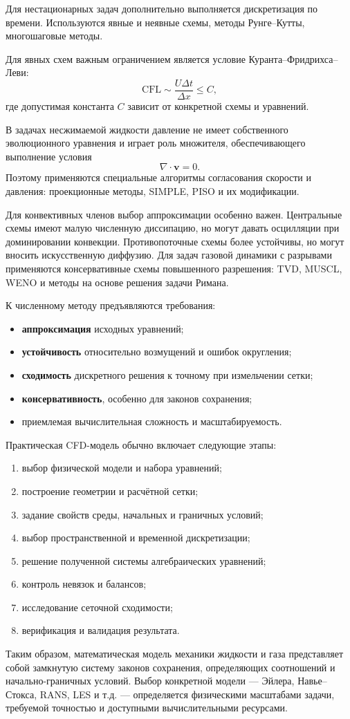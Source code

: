 Для нестационарных задач дополнительно выполняется дискретизация по времени. Используются явные и неявные схемы, методы Рунге--Кутты, многошаговые методы.

Для явных схем важным ограничением является условие Куранта--Фридрихса--Леви:
\[
\mathrm{CFL}
\sim
\frac{U\Delta t}{\Delta x}
\le C,
\]
где допустимая константа $C$ зависит от конкретной схемы и уравнений.

В задачах несжимаемой жидкости давление не имеет собственного эволюционного уравнения и играет роль множителя, обеспечивающего выполнение условия
\[
\nabla\cdot\mathbf{v}=0.
\]
Поэтому применяются специальные алгоритмы согласования скорости и давления: проекционные методы, SIMPLE, PISO и их модификации.

Для конвективных членов выбор аппроксимации особенно важен. Центральные схемы имеют малую численную диссипацию, но могут давать осцилляции при доминировании конвекции. Противопоточные схемы более устойчивы, но могут вносить искусственную диффузию. Для задач газовой динамики с разрывами применяются консервативные схемы повышенного разрешения: TVD, MUSCL, WENO и методы на основе решения задачи Римана.

К численному методу предъявляются требования:
\begin{itemize}
	\item \textbf{аппроксимация} исходных уравнений;
	\item \textbf{устойчивость} относительно возмущений и ошибок округления;
	\item \textbf{сходимость} дискретного решения к точному при измельчении сетки;
	\item \textbf{консервативность}, особенно для законов сохранения;
	\item приемлемая вычислительная сложность и масштабируемость.
\end{itemize}

Практическая CFD-модель обычно включает следующие этапы:
\begin{enumerate}
	\item выбор физической модели и набора уравнений;
	\item построение геометрии и расчётной сетки;
	\item задание свойств среды, начальных и граничных условий;
	\item выбор пространственной и временной дискретизации;
	\item решение полученной системы алгебраических уравнений;
	\item контроль невязок и балансов;
	\item исследование сеточной сходимости;
	\item верификация и валидация результата.
\end{enumerate}

Таким образом, математическая модель механики жидкости и газа представляет собой замкнутую систему законов сохранения, определяющих соотношений и начально-граничных условий. Выбор конкретной модели --- Эйлера, Навье--Стокса, RANS, LES и т.д. --- определяется физическими масштабами задачи, требуемой точностью и доступными вычислительными ресурсами.

\newpage
